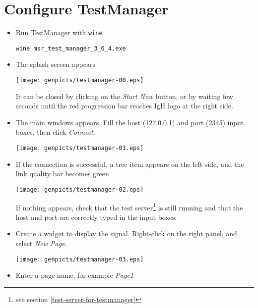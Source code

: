 \section{Configure TestManager}
\begin{itemize}

\item Run TestManager with \texttt{wine}

\begin{verbatim}
wine msr_test_manager_3_6_4.exe
\end{verbatim}


\item The splash screen appears

\begin{center}
\texttt{[image: genpicts/testmanager-00.eps]}
\end{center}

It can be closed by clicking on the \textit{Start Now} button,
or by waiting few seconds until the red progression bar reaches
IgH logo at the right side.


\item The main windows appears. Fill the host (127.0.0.1) and port
  (2345) input boxes, then click \textit{Connect}.

\begin{center}
\texttt{[image: genpicts/testmanager-01.eps]}
\end{center}


\item If the connection is successful, a tree item appears on the left
  side, and the link quality bar becomes green

\begin{center}
\texttt{[image: genpicts/testmanager-02.eps]}
\end{center}

If nothing appears, check that the test server\footnote{see
section \ref{test-server-for-testmanager}}
is still running and that the host and port are correctly
typed in the input boxes.


\item Create a widget to display the signal.
  Right-click on the right panel, and select \textit{New Page}.

\begin{center}
\texttt{[image: genpicts/testmanager-03.eps]}
\end{center}

\item Enter a page name, for example \textit{Page1}


\end{itemize}
